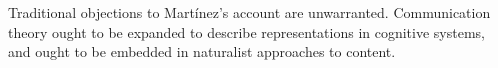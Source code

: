 Traditional objections to Mart\'{i}nez's account are unwarranted.
Communication theory ought to be expanded to describe representations in cognitive systems, and ought to be embedded in naturalist approaches to content.

